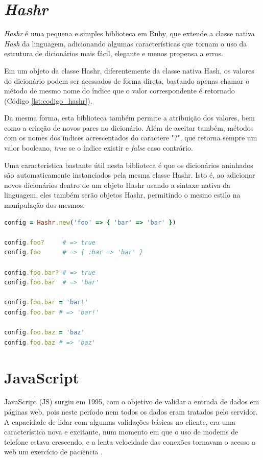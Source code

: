\section{\textit{Hashr}}

\textit{Hashr} \cite{HASHR} é uma pequena e simples biblioteca em Ruby, que extende a classe nativa \textit{Hash} da linguagem, adicionando algumas características que tornam o uso da estrutura de dicionários mais fácil, elegante e menos propensa a erros.

Em um objeto da classe Hashr, diferentemente da classe nativa Hash, os valores do dicionário podem ser acessados de forma direta, bastando apenas chamar o método de mesmo nome do índice que o valor correspondente é retornado (Código \ref{lst:codigo_hashr}).

Da mesma forma, esta biblioteca também permite a atribuição dos valores, bem como a criação de novos pares no dicionário. Além de aceitar também, métodos com os nomes dos índices acrescentados do caractere "?", que retorna sempre um valor booleano, \textit{true} se o índice existir e \textit{false} caso contrário.

Uma característica bastante útil nesta biblioteca é que os dicionários aninhados são automaticamente instanciados pela mesma classe Hashr. Isto é, ao adicionar novos dicionários dentro de um objeto Hashr usando a sintaxe nativa da linguagem, eles também serão objetos Hashr, permitindo o mesmo estilo na manipulação dos mesmos.

{\singlespace
\begin{lstlisting}[caption=Exemplo do uso da classe \textit{Hashr} retirado da página do projeto, language=Ruby,label={lst:codigo_hashr}]
config = Hashr.new('foo' => { 'bar' => 'bar' })

config.foo?     # => true
config.foo      # => { :bar => 'bar' }

config.foo.bar? # => true
config.foo.bar  # => 'bar'

config.foo.bar = 'bar!'
config.foo.bar # => 'bar!'

config.foo.baz = 'baz'
config.foo.baz # => 'baz'\end{lstlisting}
}


\section{JavaScript}

JavaScript (JS) surgiu em 1995, com o objetivo de validar a entrada de dados em páginas web, pois neste período nem todos os dados eram tratados pelo servidor. A capacidade de lidar com algumas validações básicas no cliente, era uma característica nova e excitante, num momento em que o uso de modems de telefone estava crescendo, e a lenta velocidade das conexões tornavam o acesso a web um exercício de paciência \cite{ZAKAS}.

